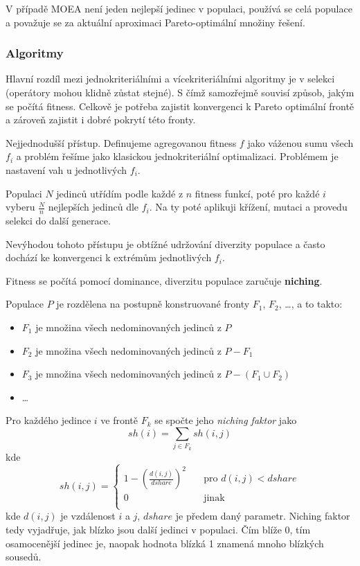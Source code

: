 V případě MOEA není jeden nejlepší jedinec v populaci, používá se celá populace a považuje se za aktuální aproximaci Pareto-optimální množiny řešení. 

\subsubsection{Algoritmy}
Hlavní rozdíl mezi jednokriteriálními a vícekriteriálními algoritmy je v selekci (operátory mohou klidně zůstat stejné). S čímž samozřejmě souvisí způsob, jakým se počítá fitness. Celkově je potřeba zajistit konvergenci k Pareto optimální frontě a zároveň zajistit i dobré pokrytí této fronty.
\begin{description}
	\leftskip 40pt
	\setlength{\itemsep}{0pt}
	\item[Agregace fitness] Nejjednodušší přístup. Definujeme agregovanou fitness $f$ jako váženou sumu všech $f_i$ a problém řešíme jako klasickou jednokriteriální optimalizaci. Problémem je nastavení vah u jednotlivých $f_i$.
	\item[VEGA (Vector Evaluated GA)] Populaci $N$ jedinců utřídím podle každé z $n$ fitness funkcí, poté pro každé $i$ vyberu $\frac{N}{n}$ nejlepších jedinců dle $f_i$. Na ty poté aplikuji křížení, mutaci a provedu selekci do další generace. 
	
	Nevýhodou tohoto přístupu je obtížné udržování diverzity populace a často dochází ke konvergenci k extrémům jednotlivých $f_i$.
	\item[NSGA (Non-dominated sorting GA)] Fitness se počítá pomocí dominance, diverzitu populace zaručuje \textbf{niching}.
	
	Populace $P$ je rozdělena na postupně konstruované fronty $F_1$, $F_2$, \dots, a to takto: 
	\begin{itemize}
		\leftskip 40pt
		\setlength{\itemsep}{0pt}
		\item $F_1$ je množina všech nedominovaných jedinců z $P$
		\item $F_2$ je množina všech nedominovaných jedinců z $P-F_1$
		\item $F_3$ je množina všech nedominovaných jedinců z $P - (F_1 \cup F_2)$
		\item \dots
	\end{itemize}
	
	Pro každého jedince $i$ ve frontě $F_k$ se spočte jeho \textit{niching faktor} jako
	$$sh(i) = \sum_{j \in F_k} sh(i,j)$$
	kde 
	$$
	sh(i,j) = 
	\begin{cases}
		1 - \left(\frac{d(i,j)}{dshare}\right)^2 	& \quad \text{pro $d(i,j) < dshare$} \\
		0 											& \quad \text{jinak}\\
	\end{cases}
	$$
	kde $d(i,j)$ je vzdálenost $i$ a $j$, $dshare$ je předem daný parametr. Niching faktor tedy vyjadřuje, jak blízko jsou další jedinci v populaci. Čím blíže 0, tím osamocenější jedinec je, naopak hodnota blízká 1 znamená mnoho blízkých sousedů.
	

\end{description}
